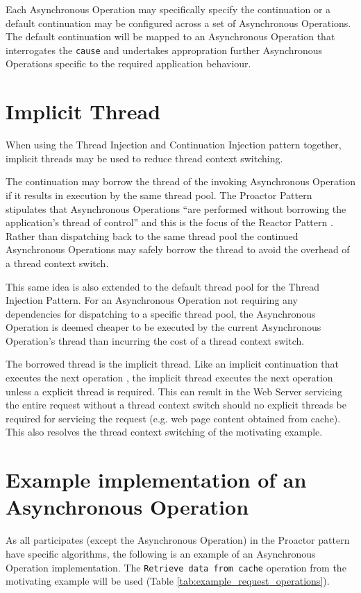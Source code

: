 \documentclass{article}
\begin{document}
Each Asynchronous Operation may specifically specify the continuation or a
default continuation may be configured across a set of Asynchronous Operations. 
The default continuation will be mapped to an Asynchronous Operation that
interrogates the \texttt{cause} and undertakes appropration further Asynchronous
Operations specific to the required application behaviour.


\section{Implicit Thread}

When using the Thread Injection and Continuation Injection pattern together,
implicit threads may be used to reduce thread context switching.

The continuation may borrow the thread of the invoking Asynchronous Operation if
it results in execution by the same thread pool.  The Proactor Pattern
stipulates that Asynchronous Operations ``are performed without borrowing the
application's thread of control'' \cite{proactor} and this is the focus of the
Reactor Pattern \cite{reactor}.  Rather than dispatching back to the same thread
pool the continued Asynchronous Operations may safely borrow the thread to avoid
the overhead of a thread context switch.

This same idea is also extended to the default thread pool for the Thread
Injection Pattern.  For an Asynchronous Operation not requiring any dependencies
for dispatching to a specific thread pool, the Asynchronous Operation is deemed
cheaper to be executed by the current Asynchronous Operation's thread than
incurring the cost of a thread context switch.

The borrowed thread is the implicit thread.  Like an implicit continuation that
executes the next operation \cite{continuations}, the implicit thread executes
the next operation unless a explicit thread is required.  This can result in the
Web Server servicing the entire request without a thread context switch should
no explicit threads be required for servicing the request (e.g. web page content
obtained from cache).  This also resolves the thread context switching of the
motivating example.


\section{Example implementation of an Asynchronous Operation}

As all participates (except the Asynchronous Operation) in the Proactor pattern
have specific algorithms, the following is an example of an Asynchronous
Operation implementation.  The \texttt{Retrieve data from cache} operation from
the motivating example will be used (Table
\ref{tab:example_request_operations}).
\end{document}
